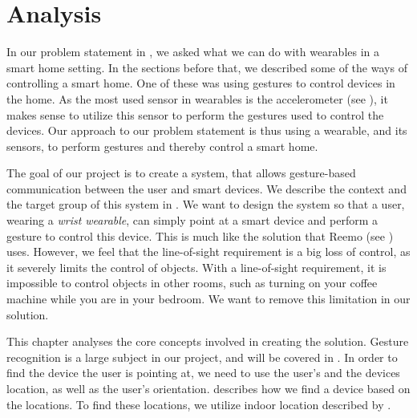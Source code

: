 \chapter{Analysis}\label{chap:analysis}

In our problem statement in , 
we asked what we can do with wearables in a smart home setting.
In the sections before that, 
we described some of the ways of controlling a smart home. 
One of these was using gestures to control devices in the home. 
As the most used sensor in wearables is the accelerometer (see ), 
it makes sense to utilize this sensor to perform the gestures used to control the devices. 
Our approach to our problem statement is thus using a wearable, 
and its sensors, to perform gestures and thereby control a smart home. 

The goal of our project is to create a system, 
that allows gesture-based communication between the user and smart devices.
We describe the context and the target group of this system in .
We want to design the system so that a user, wearing a \emph{wrist wearable}, 
can simply point at a smart device and perform a gesture to control this device. 
This is much like the solution that Reemo (see ) uses. 
However, we feel that the line-of-sight requirement is a big loss of control, 
as it severely limits the control of objects.
With a line-of-sight requirement, 
it is impossible to control objects in other rooms, 
such as turning on your coffee machine while you are in your bedroom. 
We want to remove this limitation in our solution. 

This chapter analyses the core concepts involved in creating the solution.
Gesture recognition is a large subject in our project, 
and will be covered in . 
In order to find the device the user is pointing at,
we need to use the user's and the devices location, 
as well as the user's orientation. 
 describes how we find a device based on the locations. 
To find these locations, we utilize indoor location described by .




